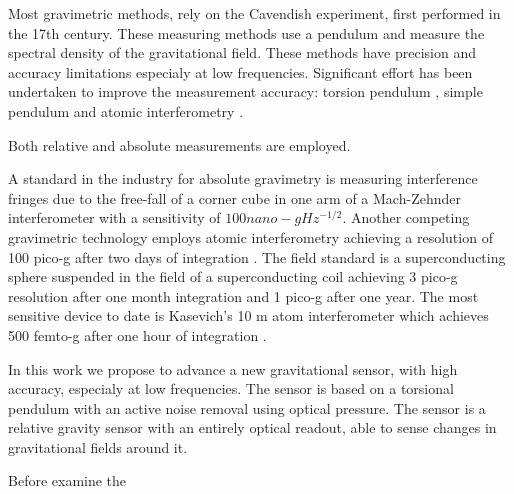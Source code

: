 \documentclass[\main/master.tex]{subfiles}
\begin{document}
\par
Most gravimetric methods, rely on the Cavendish experiment, first performed in the 17th century. These measuring methods use a pendulum and measure the spectral density of the gravitational field. These methods have precision and accuracy limitations especialy at low frequencies. Significant effort has been undertaken to improve the measurement accuracy: torsion pendulum \cite{Luther82,Kuroda95,Karagioz96,Bagley97,Gundlach00,Quinn01,Armstrong03}, simple pendulum \cite {Kleinevoss99,Parks10} and atomic interferometry \cite{Lamporesi08,Sorrentino10,Rosi14}.
\par
Both relative and absolute measurements are employed. 
\par
A standard in the industry for absolute gravimetry is measuring interference fringes due to the free-fall of a corner cube in one arm of a Mach-Zehnder interferometer with a sensitivity of $100 nano-g Hz^{-1/2}$. Another competing gravimetric technology employs atomic interferometry achieving a resolution of 100 pico-g after two days of integration \cite{Peters01}. 
The field standard is a superconducting sphere suspended in the field of a superconducting coil achieving 3 pico-g resolution \cite{Goodkind99} after one month integration and 1 pico-g  after one year. 
The most sensitive device to date is Kasevich's 10 m atom interferometer which achieves 500 femto-g after one hour of integration \cite{PhysRevA.91.033629,kasevich2014prospects}. 
\par
In this work we propose to advance a new gravitational sensor, with high accuracy, especialy at low frequencies. The sensor is based on a torsional pendulum with an active noise removal using optical pressure. The sensor is a relative gravity sensor with an entirely optical readout, able to sense changes in gravitational fields around it. 
\par
Before examine the 



\end{document}
